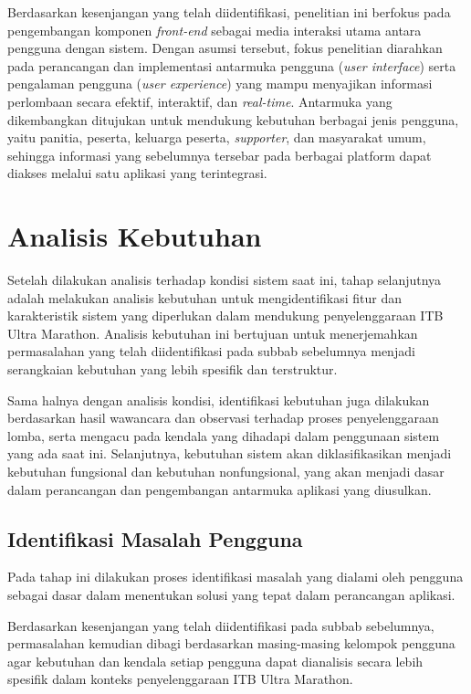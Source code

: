 Berdasarkan kesenjangan yang telah diidentifikasi, penelitian ini berfokus pada pengembangan komponen \textit{front-end} sebagai media interaksi utama antara pengguna dengan sistem. Dengan asumsi tersebut, fokus penelitian diarahkan pada perancangan dan implementasi antarmuka pengguna (\textit{user interface}) serta pengalaman pengguna (\textit{user experience}) yang mampu menyajikan informasi perlombaan secara efektif, interaktif, dan \textit{real-time}. Antarmuka yang dikembangkan ditujukan untuk mendukung kebutuhan berbagai jenis pengguna, yaitu panitia, peserta, keluarga peserta, \textit{supporter}, dan masyarakat umum, sehingga informasi yang sebelumnya tersebar pada berbagai platform dapat diakses melalui satu aplikasi yang terintegrasi.

\section{Analisis Kebutuhan}
Setelah dilakukan analisis terhadap kondisi sistem saat ini, tahap selanjutnya adalah melakukan analisis kebutuhan untuk mengidentifikasi fitur dan karakteristik sistem yang diperlukan dalam mendukung penyelenggaraan ITB Ultra Marathon. Analisis kebutuhan ini bertujuan untuk menerjemahkan permasalahan yang telah diidentifikasi pada subbab sebelumnya menjadi serangkaian kebutuhan yang lebih spesifik dan terstruktur.

Sama halnya dengan analisis kondisi, identifikasi kebutuhan juga dilakukan berdasarkan hasil wawancara dan observasi terhadap proses penyelenggaraan lomba, serta mengacu pada kendala yang dihadapi dalam penggunaan sistem yang ada saat ini. Selanjutnya, kebutuhan sistem akan diklasifikasikan menjadi kebutuhan fungsional dan kebutuhan nonfungsional, yang akan menjadi dasar dalam perancangan dan pengembangan antarmuka aplikasi yang diusulkan.

\subsection{Identifikasi Masalah Pengguna} 
Pada tahap ini dilakukan proses identifikasi masalah yang dialami oleh
pengguna sebagai dasar dalam menentukan solusi yang tepat dalam perancangan
aplikasi.

Berdasarkan kesenjangan yang telah diidentifikasi pada subbab sebelumnya,
permasalahan kemudian dibagi berdasarkan masing-masing kelompok pengguna agar
kebutuhan dan kendala setiap pengguna dapat dianalisis secara lebih spesifik
dalam konteks penyelenggaraan ITB Ultra Marathon. 

